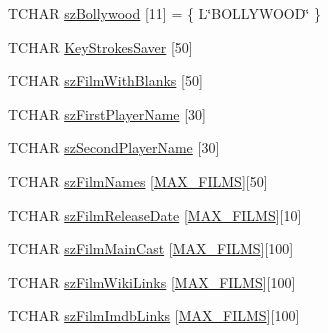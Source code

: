 \begin{DoxyCompactItemize}
\item 
T\+C\+H\+A\+R \hyperlink{_b_o_w-a_01film_01guessing_01game_8cpp_aedf0cbc1060fead9a0a886a70839adc6}{sz\+Bollywood} \mbox{[}11\mbox{]} = \{ L\char`\"{}B\+O\+L\+L\+Y\+W\+O\+O\+D\char`\"{} \}
\item 
T\+C\+H\+A\+R \hyperlink{_b_o_w-a_01film_01guessing_01game_8cpp_a5395e1d056409332f992a2be60057f52}{Key\+Strokes\+Saver} \mbox{[}50\mbox{]}
\item 
T\+C\+H\+A\+R \hyperlink{_b_o_w-a_01film_01guessing_01game_8cpp_a11d6153ad375461db42b9361294baf70}{sz\+Film\+With\+Blanks} \mbox{[}50\mbox{]}
\item 
T\+C\+H\+A\+R \hyperlink{_b_o_w-a_01film_01guessing_01game_8cpp_a256db13e12f5162c4691b74f4f22b022}{sz\+First\+Player\+Name} \mbox{[}30\mbox{]}
\item 
T\+C\+H\+A\+R \hyperlink{_b_o_w-a_01film_01guessing_01game_8cpp_a41b8733f446795d8c7f235a56942fdde}{sz\+Second\+Player\+Name} \mbox{[}30\mbox{]}
\item 
T\+C\+H\+A\+R \hyperlink{_b_o_w-a_01film_01guessing_01game_8cpp_a85e5959c4bc22d8f1f1633372b67e1ba}{sz\+Film\+Names} \mbox{[}\hyperlink{_b_o_w-a_01film_01guessing_01game_8cpp_aa31048f49d109f6551271267f3470d11}{M\+A\+X\+\_\+\+F\+I\+L\+M\+S}\mbox{]}\mbox{[}50\mbox{]}
\item 
T\+C\+H\+A\+R \hyperlink{_b_o_w-a_01film_01guessing_01game_8cpp_a02f5aa7ae1dd7f88cc51f45b5ce4007c}{sz\+Film\+Release\+Date} \mbox{[}\hyperlink{_b_o_w-a_01film_01guessing_01game_8cpp_aa31048f49d109f6551271267f3470d11}{M\+A\+X\+\_\+\+F\+I\+L\+M\+S}\mbox{]}\mbox{[}10\mbox{]}
\item 
T\+C\+H\+A\+R \hyperlink{_b_o_w-a_01film_01guessing_01game_8cpp_ae1f4d278947a20ab67e1c5d1eca21018}{sz\+Film\+Main\+Cast} \mbox{[}\hyperlink{_b_o_w-a_01film_01guessing_01game_8cpp_aa31048f49d109f6551271267f3470d11}{M\+A\+X\+\_\+\+F\+I\+L\+M\+S}\mbox{]}\mbox{[}100\mbox{]}
\item 
T\+C\+H\+A\+R \hyperlink{_b_o_w-a_01film_01guessing_01game_8cpp_afd00366e1d43294ba013715e9b42874d}{sz\+Film\+Wiki\+Links} \mbox{[}\hyperlink{_b_o_w-a_01film_01guessing_01game_8cpp_aa31048f49d109f6551271267f3470d11}{M\+A\+X\+\_\+\+F\+I\+L\+M\+S}\mbox{]}\mbox{[}100\mbox{]}
\item 
T\+C\+H\+A\+R \hyperlink{_b_o_w-a_01film_01guessing_01game_8cpp_ac8e67acaa1ef598ab55e5690b5fc4e4a}{sz\+Film\+Imdb\+Links} \mbox{[}\hyperlink{_b_o_w-a_01film_01guessing_01game_8cpp_aa31048f49d109f6551271267f3470d11}{M\+A\+X\+\_\+\+F\+I\+L\+M\+S}\mbox{]}\mbox{[}100\mbox{]}
\item 

\end{DoxyCompactItemize}
